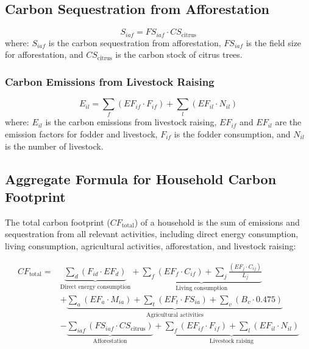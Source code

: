 \documentclass[12pt,a4paper]{article}%
\begin{document}
\subsection{Carbon Sequestration from Afforestation}
\begin{equation}
S_{iaf} = FS_{iaf} \cdot CS_{\text{citrus}}
\end{equation}
where: $S_{iaf}$ is the carbon sequestration from afforestation, $FS_{iaf}$ is the field size for afforestation, and $CS_{\text{citrus}}$ is the carbon stock of citrus trees.


\subsubsection{Carbon Emissions from Livestock Raising}
\begin{equation}
E_{il} = \sum_f (EF_{if} \cdot F_{if}) + \sum_l (EF_{il} \cdot N_{il})
\end{equation}
where: $E_{il}$ is the carbon emissions from livestock raising, $EF_{if}$ and $EF_{il}$ are the emission factors for fodder and livestock, $F_{if}$ is the fodder consumption, and $N_{il}$ is the number of livestock.



\subsection{Aggregate Formula for Household Carbon Footprint}

The total carbon footprint ($CF_{\text{total}}$) of a household is the sum of emissions and sequestration from all relevant activities, including direct energy consumption, living consumption, agricultural activities, afforestation, and livestock raising:

\begin{align}
CF_{\text{total}} = & \underbrace{\sum_d \left(F_{id} \cdot EF_d\right)}_{\text{Direct energy consumption}} + 
\underbrace{\sum_f \left(EF_f \cdot C_{if}\right) + \sum_j \frac{\left(EF_j \cdot C_{ij}\right)}{L_j}}_{\text{Living consumption}} \nonumber \\
& + \underbrace{\sum_a \left(EF_a \cdot M_{ia}\right) + \sum_t \left(EF_t \cdot FS_{ia}\right) + \sum_v \left(B_v \cdot 0.475\right)}_{\text{Agricultural activities}} \nonumber \\
& - \underbrace{\sum_{iaf} \left(FS_{iaf} \cdot CS_{\text{citrus}}\right)}_{\text{Afforestation}} +
\underbrace{\sum_f \left(EF_{if} \cdot F_{if}\right) + \sum_l \left(EF_{il} \cdot N_{il}\right)}_{\text{Livestock raising}}
\end{align}
\end{document}

